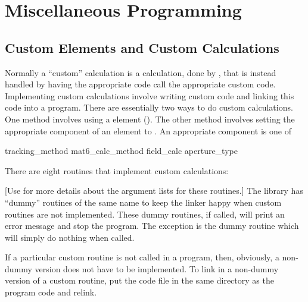 \chapter{Miscellaneous Programming}

\section{Custom Elements and Custom Calculations}
\label{s:custom.ele}

Normally a ``custom'' calculation is a calculation, 
done by \bmad, that is instead handled by having the appropriate \bmad
code call the appropriate custom code. Implementing custom
calculations involve writing custom code and linking this code into a
program. There are essentially two ways to do custom calculations. One
method involves using a  element (). The
other method involves setting the appropriate component of an element
to . An appropriate component is one of
\begin{example}
  tracking_method       
  mat6_calc_method      
  field_calc            
  aperture_type         
\end{example}

There are eight routines that implement custom calculations:
\begin{example}
\end{example}
[Use  for more details about the argument lists for these
routines.]  The \bmad library has ``dummy'' routines of the same name to
keep the linker happy when custom routines are not implemented. These
dummy routines, if called, will print an error message and stop the
program. The exception is the dummy  routine which will
simply do nothing when called.

If a particular custom routine is not called in a program, then,
obviously, a non-dummy version does not have to be implemented. To
link in a non-dummy version of a custom routine, put the code file in
the same directory as the program code and relink.

